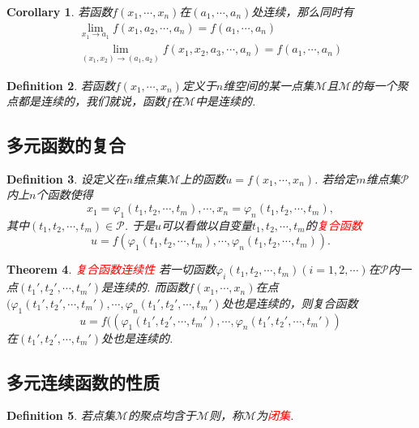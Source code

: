 \documentclass{article}
\newtheorem{theorem}{Theorem}[section]
\newtheorem{corollary}[theorem]{Corollary}
\newtheorem{definition}[theorem]{Definition}
\newcommand{\redt}[1]{\textcolor{red}{#1}}
\begin{document}
\begin{corollary}
\rm 若函数$f(x_1,\cdots,x_n)$在$(a_1,\cdots,a_n)$处连续，那么同时有
$$
\begin{array}{ll}
\lim\limits_{x_1 \to a_1}f(x_1,a_2,\cdots,a_n) = f(a_1,\cdots,a_n) \\
\lim\limits_{(x_1,x_2) \to (a_1,a_2)}f(x_1,x_2,a_3,\cdots,a_n) = f(a_1,\cdots,a_n)
\end{array}
$$
\end{corollary}

\begin{definition}
\rm 若函数$f(x_1,\cdots,x_n)$定义于$n$维空间的某一点集$\mathcal{M}$且$\mathcal{M}$的每一个聚点都是连续的，我们就说，函数$f$在$\mathcal{M}$中是连续的. 
\end{definition}


\subsection{多元函数的复合}

\begin{definition}
\rm 设定义在$n$维点集$\mathcal{M}$上的函数$u = f(x_1,\cdots,x_n)$. 若给定$m$维点集$\mathcal{P}$内上$n$个函数使得
$$
x_1 = \varphi_1(t_1,t_2,\cdots,t_m), \cdots, x_n =\varphi_n(t_1,t_2,\cdots,t_m),
$$
其中$(t_1,t_2,\cdots,t_m) \in \mathcal{P}$. 于是$u$可以看做以自变量$t_1,t_2,\cdots,t_m$的\redt{复合函数}
$$
u = f(\varphi_1(t_1,t_2,\cdots,t_m),\cdots,\varphi_n(t_1,t_2,\cdots,t_m)).
$$
\end{definition}


\begin{theorem}
\rm \redt{复合函数连续性} 若一切函数$\varphi_i(t_1,t_2,\cdots,t_m)(i=1,2,\cdots)$在$\mathcal{P}$内一点$(t_1',t_2',\cdots,t_m')$是连续的. 而函数$f(x_1, \cdots,x_n)$在点$(\varphi_1(t_1',t_2',\cdots,t_m'),\cdots,\varphi_n(t_1',t_2',\cdots,t_m')$处也是连续的，则复合函数
$$
u = f((\varphi_1(t_1',t_2',\cdots,t_m'),\cdots,\varphi_n(t_1',t_2',\cdots,t_m'))
$$
在$(t_1',t_2',\cdots,t_m')$处也是连续的. 
\end{theorem}

\subsection{多元连续函数的性质}

\begin{definition}
\rm 若点集$\mathcal{M}$的聚点均含于$\mathcal{M}$则，称$\mathcal{M}$为\redt{闭集}.
\end{definition}
\end{document}
